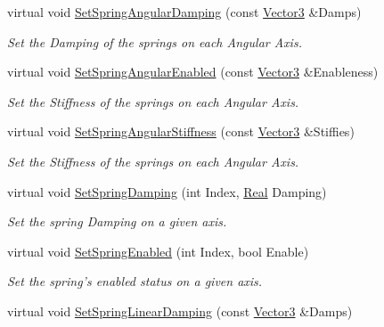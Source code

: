 \begin{DoxyCompactItemize}
virtual void \hyperlink{classMezzanine_1_1Generic6DofSpringConstraint_a7a0c52e6bbed9f58e4385ce2e1edff4c}{SetSpringAngularDamping} (const \hyperlink{classMezzanine_1_1Vector3}{Vector3} \&Damps)
\begin{DoxyCompactList}\small\item\em Set the Damping of the springs on each Angular Axis. \item\end{DoxyCompactList}\item 
virtual void \hyperlink{classMezzanine_1_1Generic6DofSpringConstraint_a49a615cb3033d6d29e4c1bd528fe2e5d}{SetSpringAngularEnabled} (const \hyperlink{classMezzanine_1_1Vector3}{Vector3} \&Enableness)
\begin{DoxyCompactList}\small\item\em Set the Stiffness of the springs on each Angular Axis. \item\end{DoxyCompactList}\item 
virtual void \hyperlink{classMezzanine_1_1Generic6DofSpringConstraint_a3340a2f24f934ba2abe86fb69a40240e}{SetSpringAngularStiffness} (const \hyperlink{classMezzanine_1_1Vector3}{Vector3} \&Stiffies)
\begin{DoxyCompactList}\small\item\em Set the Stiffness of the springs on each Angular Axis. \item\end{DoxyCompactList}\item 
virtual void \hyperlink{classMezzanine_1_1Generic6DofSpringConstraint_a230f5aff1e8214ef64fa86c49809597c}{SetSpringDamping} (int Index, \hyperlink{namespaceMezzanine_a726731b1a7df72bf3583e4a97282c6f6}{Real} Damping)
\begin{DoxyCompactList}\small\item\em Set the spring Damping on a given axis. \item\end{DoxyCompactList}\item 
virtual void \hyperlink{classMezzanine_1_1Generic6DofSpringConstraint_afa5c430106ef5cb423f6ffa95ddb1867}{SetSpringEnabled} (int Index, bool Enable)
\begin{DoxyCompactList}\small\item\em Set the spring's enabled status on a given axis. \item\end{DoxyCompactList}\item 
virtual void \hyperlink{classMezzanine_1_1Generic6DofSpringConstraint_a16c7c92d33b39f70d511c051ca63883c}{SetSpringLinearDamping} (const \hyperlink{classMezzanine_1_1Vector3}{Vector3} \&Damps)

\end{DoxyCompactItemize}
